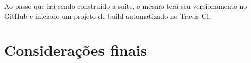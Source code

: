 \documentclass[
	article,			%
	12pt,				%
	oneside,			%
	a4paper,			%
	english,			
	brazil,
	sumario=tradicional
	]{abntex2}
\begin{document}
Ao passo que irá sendo construído a suite, o mesmo terá seu versionamento no GitHub e iniciado um projeto de build automatizado no Travis CI.

% 

\section*{Considerações finais}

\lipsum[1]

\begin{citacao}
\lipsum[2]
\end{citacao}

\lipsum[3]

\postextual




%
%







%
%
%
\end{document}
